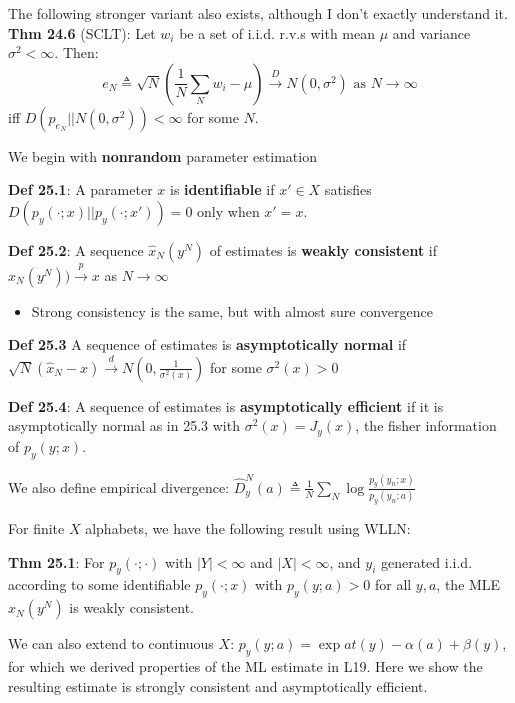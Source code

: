 \documentclass[12pt]{article} %
\begin{document}
The following stronger variant also exists, although I don't exactly understand it.
\textbf{Thm 24.6} (SCLT): Let $w_i$ be a set of i.i.d. r.v.s with mean $\mu$ and variance $\sigma^2 < \infty$. Then:
\begin{equation*}
    e_N \triangleq 
    \sqrt{N}
    \left(
    \frac{1}{N}
    \sum_N w_i - \mu
    \right)
    \xrightarrow{D} N(0, \sigma^2) \text{ as } N \rightarrow \infty
\end{equation*}
iff $D(p_{e_N}||N(0,\sigma^2)) < \infty$ for some $N$.



\newpage


We begin with \textbf{nonrandom} parameter estimation 

\textbf{Def 25.1}: A parameter $x$ is \textbf{identifiable} if $x' \in X$ satisfies $D(p_y(\cdot;x)||p_y(\cdot;x')) = 0$ only when $x' = x$.

\textbf{Def 25.2}: A sequence $\hat{x}_N(y^N)$ of estimates is \textbf{weakly consistent} if $\hat{x}_N(y^N)) \xrightarrow{p} x$ as $N \rightarrow \infty$
\begin{itemize}[topsep=-1pt, itemsep=-1pt]
    \item 
Strong consistency is the same, but with almost sure convergence
\end{itemize}

\textbf{Def 25.3} A sequence of estimates  is \textbf{asymptotically normal} if $\sqrt{N} (\hat{x}_N - x) \xrightarrow{d} N(0, \frac{1}{\sigma^2(x)})$ for some $\sigma^2(x) > 0$

\textbf{Def 25.4}: A sequence of estimates is \textbf{asymptotically efficient} if it is asymptotically normal as in 25.3 with $\sigma^2(x) = J_y(x)$, the fisher information of $p_y(y;x)$.

We also define empirical divergence: $\hat{D}_y^N(a) \triangleq \frac{1}{N} \sum_N \log \frac{p_y(y_n;x)}{p_y(y_n;a)}$

\separate

For finite $X$ alphabets, we have the following result using WLLN:

\textbf{Thm 25.1}: For $p_y(\cdot;\cdot)$ with $|Y| < \infty$ and $|X| < \infty$, and $y_i$ generated i.i.d. according to some identifiable $p_y(\cdot;x)$ with $p_y(y;a) > 0$ for all $y,a$, the MLE $\hat{x}_N(y^N)$ is weakly consistent.

We can also extend to continuous $X$: $p_y(y;a) = \exp{at(y) - \alpha(a) + \beta(y)}$, for which we derived properties of the ML estimate in L19. Here we show the resulting estimate is strongly consistent and asymptotically efficient.
\end{document}
